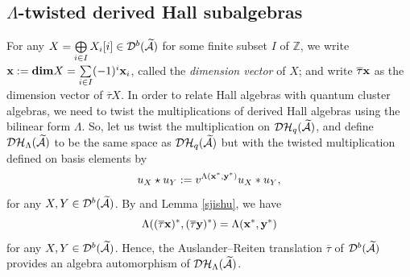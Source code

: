 \documentclass[reqno,12pt]{amsart}
\numberwithin{equation}{section}
\theoremstyle{plain} %
\theoremstyle{definition} %
\begin{document}
\subsection{$\Lambda$-twisted derived Hall subalgebras}
For any $X=\bigoplus\limits_{i\in I}X_i[i]\in \mathcal{D}^b(\widetilde{\mathcal{A}})$ for some finite subset $I$ of $\mathbb{Z}$, we write ${\bf x}:={\mbox{\rm \textbf{dim}}}X=\sum\limits_{i\in I}(-1)^i{\bf x}_i$, called the {\em dimension vector} of $X$; and write $\overline{\tau}{\bf x}$ as the dimension vector of $\overline{\tau}X$.
In order to relate Hall algebras with quantum cluster algebras, we need to twist the multiplications of derived Hall algebras using the bilinear form $\Lambda$.
So, let us twist the multiplication on $\mathcal {D}\mathcal {H}_q(\widetilde{\mathcal{A}})$, and define $\mathcal {D}\mathcal {H}_\Lambda(\widetilde{\mathcal{A}})$ to be the same space as $\mathcal {D}\mathcal {H}_q(\widetilde{\mathcal{A}})$ but with the twisted
multiplication defined on basis elements by
\begin{equation*}
   u_{X}\star u_{Y}:=
   v^{\Lambda({\bf x}^\ast,{\bf y}^\ast)}
   u_{X}\ast u_{Y},
\end{equation*}
for any $X,Y\in \mathcal{D}^b(\widetilde{\mathcal{A}})$. By \cite[Lemma 6.4]{CDZ} and Lemma \ref{sjishu}, we have
\begin{equation}\Lambda((\overline{\tau}{\bf x})^\ast,(\overline{\tau}{\bf y})^\ast)=\Lambda({\bf x}^\ast,{\bf y}^\ast)\end{equation}
for any $X,Y\in \mathcal{D}^b(\widetilde{\mathcal{A}})$. Hence, the Auslander--Reiten translation $\overline{\tau}$ of $\mathcal{D}^b(\widetilde{\mathcal{A}})$ provides an algebra automorphism of $\mathcal {D}\mathcal {H}_\Lambda(\widetilde{\mathcal{A}})$.
\end{document}
